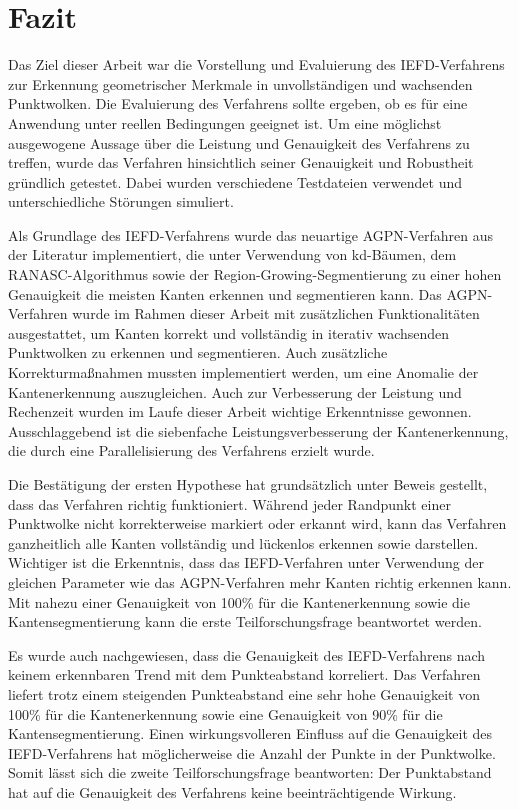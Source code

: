\chapter{Fazit}

Das Ziel dieser Arbeit war die Vorstellung und Evaluierung des IEFD-Verfahrens zur Erkennung geometrischer Merkmale in unvollständigen und wachsenden Punktwolken. Die Evaluierung des Verfahrens sollte ergeben, ob es für eine Anwendung unter reellen Bedingungen geeignet ist. Um eine möglichst ausgewogene Aussage über die Leistung und Genauigkeit des Verfahrens zu treffen, wurde das Verfahren hinsichtlich seiner Genauigkeit und Robustheit gründlich getestet. Dabei wurden verschiedene Testdateien verwendet und unterschiedliche Störungen simuliert. 

Als Grundlage des IEFD-Verfahrens wurde das neuartige AGPN-Verfahren aus der Literatur implementiert, die unter Verwendung von kd-Bäumen, dem RANASC-Algorithmus sowie der Region-Growing-Segmentierung zu einer hohen Genauigkeit die meisten Kanten erkennen und segmentieren kann. Das AGPN-Verfahren wurde im Rahmen dieser Arbeit mit zusätzlichen Funktionalitäten ausgestattet, um Kanten korrekt und vollständig in iterativ wachsenden Punktwolken zu erkennen und segmentieren. Auch zusätzliche Korrekturmaßnahmen mussten implementiert werden, um eine Anomalie der Kantenerkennung auszugleichen. Auch zur Verbesserung der Leistung und Rechenzeit wurden im Laufe dieser Arbeit wichtige Erkenntnisse gewonnen. Ausschlaggebend ist die siebenfache Leistungsverbesserung der Kantenerkennung, die durch eine Parallelisierung des Verfahrens erzielt wurde.

Die Bestätigung der ersten Hypothese hat grundsätzlich unter Beweis gestellt, dass das Verfahren richtig funktioniert. Während jeder Randpunkt einer Punktwolke nicht korrekterweise markiert oder erkannt wird, kann das Verfahren ganzheitlich alle Kanten vollständig und lückenlos erkennen sowie darstellen. Wichtiger ist die Erkenntnis, dass das IEFD-Verfahren unter Verwendung der gleichen Parameter wie das AGPN-Verfahren mehr Kanten richtig erkennen kann. Mit nahezu einer Genauigkeit von 100\% für die Kantenerkennung sowie die Kantensegmentierung kann die erste Teilforschungsfrage beantwortet werden. 

Es wurde auch nachgewiesen, dass die Genauigkeit des IEFD-Verfahrens nach keinem erkennbaren Trend mit dem Punkteabstand korreliert. Das Verfahren liefert trotz einem steigenden Punkteabstand eine sehr hohe Genauigkeit von 100\% für die Kantenerkennung sowie eine Genauigkeit von 90\% für die Kantensegmentierung. Einen wirkungsvolleren Einfluss auf die Genauigkeit des IEFD-Verfahrens hat möglicherweise die Anzahl der Punkte in der Punktwolke. Somit lässt sich die zweite Teilforschungsfrage beantworten: Der Punktabstand hat auf die Genauigkeit des Verfahrens keine beeinträchtigende Wirkung. 


